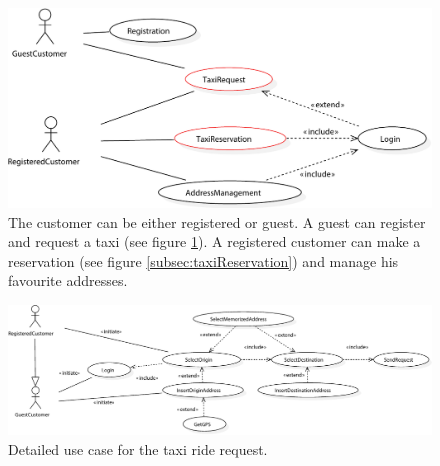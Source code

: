 \begin{figure}
	\includegraphics[width=\linewidth]{img/U_CustomerManagementGLOBAL}
	\caption{The customer can be either registered or guest. A guest can register and request a taxi (see figure \protect\ref{fig:taxiRequest}). A registered customer can make a reservation (see figure \protect\ref{subsec:taxiReservation}) and manage his favourite addresses.}
\end{figure}	


\begin{figure}
	\includegraphics[width=\linewidth]{img/U_TaxiRequest.pdf}
	\caption{Detailed use case for the taxi ride request.}
	\label{fig:taxiRequest}	
\end{figure}	


